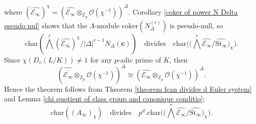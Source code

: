 \documentclass[reqno]{amsart}
\begin{document}
where
$(\widehat{\mathcal{E}_{\infty}})^{\chi}=(\widehat{\mathcal{E}_{\infty}}\otimes_{\mathbb{Z}_{p}}
\mathcal{O}(\chi^{-1}))^{\Delta}$. Corollary \ref{coker of power N
Delta pseudo nul}
 shows that the $\Lambda$-module $\mathrm{coker}(N^{(r)}_{\Delta})$
 is pseudo-null, so
 $$
 \mathrm{char}(\bigwedge^{r}(\widehat{\mathcal{E}_{\infty}})^{\chi}/
 |\Delta|^{r-1}N_{\Delta}(\mathbf{c}))
\quad\mbox{divides}\quad
\mathrm{char}\bigg(\big(\bigwedge^{r}\widehat{\mathcal{E}_{\infty}}/\widehat{\mathrm{St}_{\infty}}\big)_{\chi}\bigg).
$$
Since $\chi(D_{v}(L/K))\neq 1$ for any $p$-adic prime of $K$, then
$$
(\widehat{\mathcal{E}^{\prime}_{\infty}}\otimes_{\mathbb{Z}_{p}}\mathcal{O}(\chi^{-1}))^{\Delta}
\cong
(\widehat{\mathcal{E}_{\infty}}\otimes_{\mathbb{Z}_{p}}\mathcal{O}(\chi^{-1}))^{\Delta}.
$$
Hence the theorem follows from Theorem \ref{theorem fcan divides d
Euler system} and Lemma \ref{chi quotient of class group and
canonique conditio};
$$
\mathrm{char}((A_{\infty})_{\chi})\quad \mbox{divides}\quad p^{d}.
\mathrm{char}
\bigg(\big(\bigwedge^{r}\widehat{\mathcal{E}_{\infty}}/\widehat{\mathrm{St}_{\infty}}\big)_{\chi}\bigg).
$$
 
\end{document}
